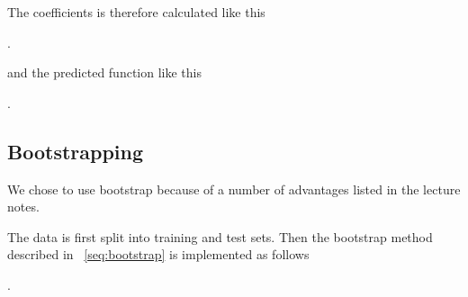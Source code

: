 The coefficients is therefore calculated like this 

.

and the predicted function like this 

.

\subsection{Bootstrapping} 
We chose to use bootstrap because of a number of advantages listed in the 
lecture notes. ~\cite{LectureNotes-FysStk}

The data is first split into training and test sets. 
Then the bootstrap method described in ~\ref{seq:bootstrap} is 
implemented as follows

.
~\cite{BiasAndVariance}




